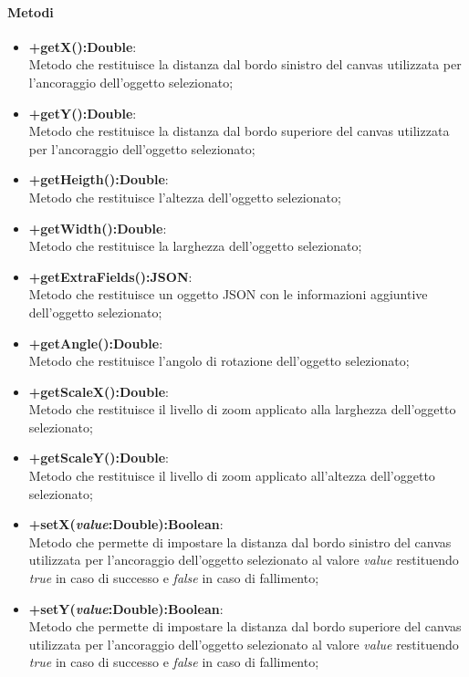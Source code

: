 	\paragraph{Metodi}
	\begin{itemize}
	\item \textbf{+getX():Double}:\\
		Metodo che restituisce la distanza dal bordo sinistro del canvas utilizzata per l'ancoraggio dell'oggetto selezionato;
	\item \textbf{+getY():Double}:\\
		Metodo che restituisce la distanza dal bordo superiore del canvas utilizzata per l'ancoraggio dell'oggetto selezionato;
	\item \textbf{+getHeigth():Double}:\\
		Metodo che restituisce l'altezza dell'oggetto selezionato;
	\item \textbf{+getWidth():Double}:\\
		Metodo che restituisce la larghezza dell'oggetto selezionato;
	\item \textbf{+getExtraFields():JSON}:\\
		Metodo che restituisce un oggetto JSON con le informazioni aggiuntive dell'oggetto selezionato;
	\item \textbf{+getAngle():Double}:\\
		Metodo che restituisce l'angolo di rotazione dell'oggetto selezionato;
	\item \textbf{+getScaleX():Double}:\\
		Metodo che restituisce il livello di zoom applicato alla larghezza dell'oggetto selezionato;
	\item \textbf{+getScaleY():Double}:\\
		Metodo che restituisce il livello di zoom applicato all'altezza dell'oggetto selezionato;
	\item \textbf{+setX(\textit{value}:Double):Boolean}:\\
		Metodo che permette di impostare la distanza dal bordo sinistro del canvas utilizzata per l'ancoraggio dell'oggetto selezionato al valore \textit{value} restituendo \textit{true} in caso di successo e \textit{false} in caso di fallimento;
	\item \textbf{+setY(\textit{value}:Double):Boolean}:\\
		Metodo che permette di impostare la distanza dal bordo superiore del canvas utilizzata per l'ancoraggio dell'oggetto selezionato al valore \textit{value} restituendo \textit{true} in caso di successo e \textit{false} in caso di fallimento;

\end{itemize}
